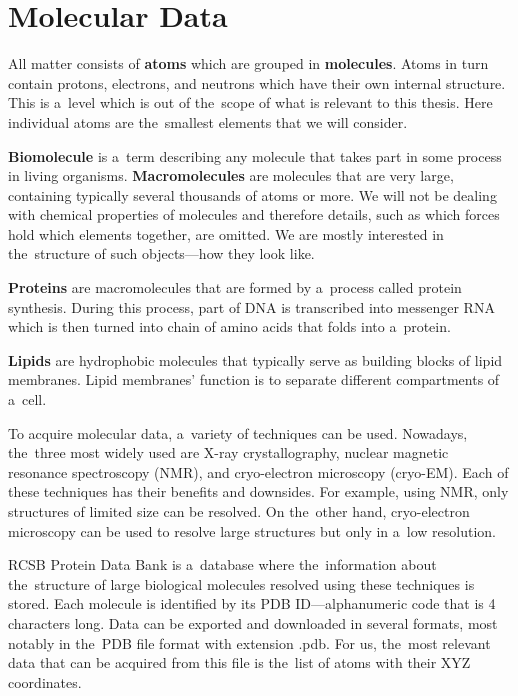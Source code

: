 \documentclass[
  digital, %
  table,   %
  nolof,     %
  nolot,     %
  oneside,
]{fithesis3}
\begin{document}
\section{Molecular Data}
All matter consists of \textbf{atoms} which are grouped in \textbf{molecules}. Atoms in turn contain protons, electrons, and neutrons which have their own internal structure. This is a level which is out of the scope of what is relevant to this thesis. Here individual atoms are the smallest elements that we will consider.

\textbf{Biomolecule} is a term describing any molecule that takes part in some process in living organisms. \textbf{Macromolecules} are molecules that are very large, containing typically several thousands of atoms or more. We will not be dealing with chemical properties of molecules and therefore details, such as which forces hold which elements together, are omitted. We are mostly interested in the structure of such objects—how they look like.

\textbf{Proteins} are macromolecules that are formed by a process called protein synthesis. During this process, part of DNA is transcribed into messenger RNA which is then turned into chain of amino acids that folds into a protein.

\textbf{Lipids} are hydrophobic molecules that typically serve as building blocks of lipid membranes. Lipid membranes' function is to separate different compartments of a cell.

To acquire molecular data, a variety of techniques can be used. Nowadays, the three most widely used are X-ray crystallography, nuclear magnetic resonance spectroscopy (NMR), and cryo-electron microscopy (cryo-EM). Each of these techniques has their benefits and downsides. For example, using NMR, only structures of limited size can be resolved. On the other hand, cryo-electron microscopy can be used to resolve large structures but only in a low resolution.

RCSB Protein Data Bank is a database where the information about the structure of large biological molecules resolved using these techniques is stored. Each molecule is identified by its PDB ID—alphanumeric code that is 4 characters long. Data can be exported and downloaded in several formats, most notably in the PDB file format with extension .pdb. For us, the most relevant data that can be acquired from this file is the list of atoms with their XYZ coordinates.
\end{document}
